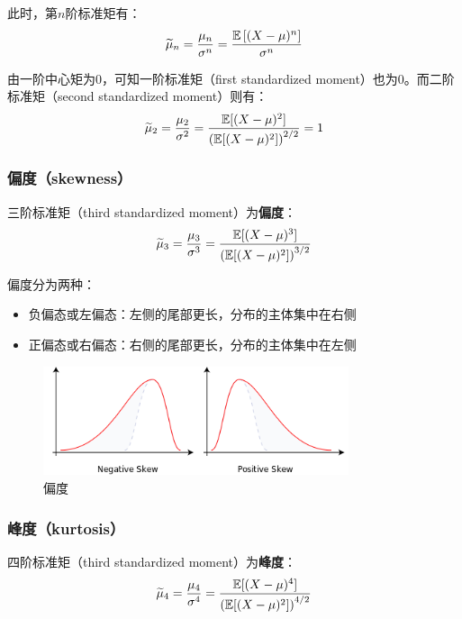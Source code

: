 \documentclass[11pt]{article}
\begin{document}
此时，第$n$阶标准矩有：
\begin{equation*}
    \widetilde{\mu}_n = \frac{\mu_n}{\sigma^n} = \frac{\mathbb{E}\left[(X-\mu)^n\right]}{\sigma^n}
\end{equation*}

由一阶中心矩为$0$，可知一阶标准矩（first standardized moment）也为$0$。而二阶标准矩（second standardized moment）则有：
\begin{equation*}
    \widetilde{\mu}_2 = \frac{\mu_2}{\sigma^2} = \frac{\mathbb{E}[(X-\mu)^2]}{\left(\mathbb{E}[(X-\mu)^2]\right)^{2/2}} = 1
\end{equation*}

\subsubsection*{偏度（skewness）}

三阶标准矩（third standardized moment）为\textbf{偏度}：
\begin{equation*}
    \widetilde{\mu}_3 = \frac{\mu_3}{\sigma^3} = \frac{\mathbb{E}[(X-\mu)^3]}{\left(\mathbb{E}[(X-\mu)^2]\right)^{3/2}}
\end{equation*}

偏度分为两种：
\begin{itemize}
    \item 负偏态或左偏态：左侧的尾部更长，分布的主体集中在右侧
    \item 正偏态或右偏态：右侧的尾部更长，分布的主体集中在左侧
\end{itemize}

\begin{figure}[H]
    \centering
    \includegraphics[width=0.8\textwidth]{fig/skewness.png}
    \caption{偏度}
    \label{fig:skew}
\end{figure}

\subsubsection*{峰度（kurtosis）}
四阶标准矩（third standardized moment）为\textbf{峰度}：
\begin{equation*}
    \widetilde{\mu}_4 = \frac{\mu_4}{\sigma^4} = \frac{\mathbb{E}[(X-\mu)^4]}{\left(\mathbb{E}[(X-\mu)^2]\right)^{4/2}} 
\end{equation*}
\end{document}
